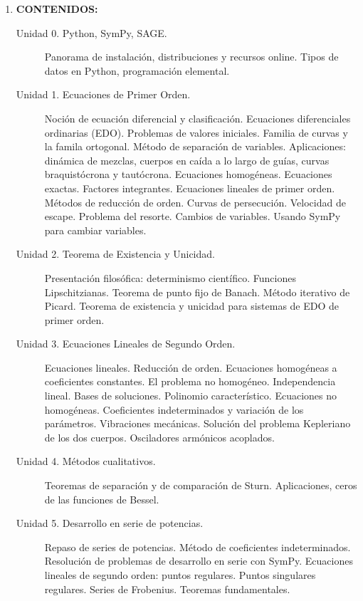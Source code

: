 \documentclass[12pt]{article}
\begin{document}
\begin{enumerate}

\item\textbf{ CONTENIDOS:}
 
\begin{description}
 \item[Unidad 0. Python, SymPy, SAGE.] Panorama de instalación, distribuciones y recursos online. Tipos de datos en Python, programación elemental. \cite{Mazzo}

\item[Unidad 1. Ecuaciones de Primer Orden.]  Noción de ecuación diferencial y clasificación. Ecuaciones diferenciales ordinarias (EDO).   Problemas de valores iniciales. Familia de curvas y la famila ortogonal. Método de separación de variables. Aplicaciones: dinámica de mezclas, cuerpos en caída a lo largo de guías, curvas braquistócrona y tautócrona. Ecuaciones homogéneas. Ecuaciones exactas. Factores integrantes. Ecuaciones lineales de primer orden. Métodos de reducción de orden. Curvas de persecución. Velocidad de escape. Problema del resorte. Cambios de variables. Usando SymPy para cambiar variables.   \cite{Mazzo,simmons_esp, WilliamE.Boyce496}

\item[Unidad 2. Teorema de Existencia y Unicidad.] Presentación filosófica: determinismo científico. Funciones Lipschitzianas. Teorema de punto fijo de Banach. Método iterativo de Picard. Teorema de existencia y unicidad para sistemas de EDO de primer orden.\cite{Mazzo,simmons_esp, WilliamE.Boyce496, JorgeSotomayor513}

\item[Unidad 3. Ecuaciones Lineales de Segundo Orden.] Ecuaciones lineales. Reducción de orden. Ecuaciones homogéneas a coeficientes constantes. El problema no homogéneo. Independencia lineal. Bases de soluciones. Polinomio característico. Ecuaciones no homogéneas. Coeficientes indeterminados y variación de los parámetros. Vibraciones mecánicas. Solución del problema Kepleriano de los dos cuerpos. Osciladores armónicos acoplados. \cite{Mazzo,simmons_esp, WilliamE.Boyce496}

\item[Unidad 4. Métodos cualitativos.] Teoremas de separación y de comparación de Sturn. Aplicaciones, ceros de las funciones de Bessel.\cite{Mazzo,simmons_esp,JorgeSotomayor513}

\item[Unidad 5. Desarrollo en serie de potencias.] Repaso de series de potencias. Método de coeficientes indeterminados.  Resolución de problemas de desarrollo en serie con  SymPy.   Ecuaciones lineales de segundo orden: puntos regulares. Puntos singulares regulares. Series de Frobenius. Teoremas fundamentales.\cite{Mazzo,simmons_esp, WilliamE.Boyce496}


\end{description}
\end{enumerate}
\end{document}
